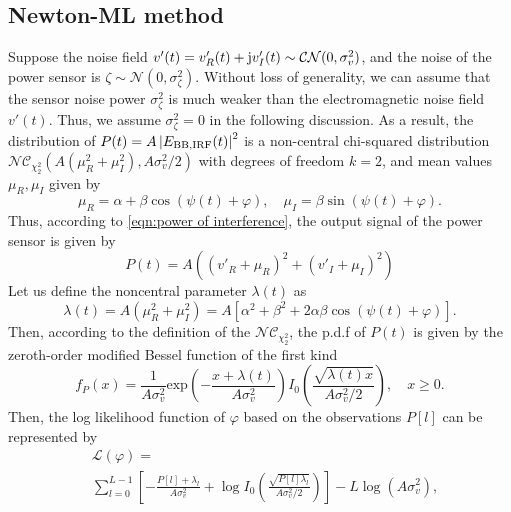 \documentclass[conference,10pt,twocolumn]{IEEEtran}
\theoremstyle{nonumberplain}
\def \exp {\text{exp}}
\def \nc {\mathcal{NC}}
\begin{document}
\subsection{Newton-ML method}  \label{ML method}
    Suppose the noise field $v'(t)=v'_R(t) + {\rm j}v'_I(t)\sim \mathcal{CN}(0, \sigma_v^2)$, and the noise of the power sensor is $\zeta \sim \mathcal{N}(0, \sigma_{\zeta}^2)$. 
    Without loss of generality, we can assume that the sensor noise power $\sigma_{\zeta}^2$ is much weaker than the electromagnetic noise field $v'(t)$.
    Thus, we assume $\sigma_{\zeta}^2=0$ in the following discussion.  
    As a result, the distribution of $P(t) = A\left|E_{{\rm BB}, {\rm IRF}}(t)\right|^2$ is a non-central chi-squared distribution $\nc_{\chi_2^2}(A(\mu_{R}^2+\mu_{I}^2),  A\sigma_v^2/2)$ with degrees of freedom $k=2$, and mean values $\mu_{R}, \mu_{I}$ given by
    \begin{equation}
        \mu_{R} = \alpha + \beta \cos(\psi(t)+\varphi),\quad  \mu_{I}  = \beta \sin(\psi(t)+\varphi).
        \label{chi2 distribution mean values}
    \end{equation}
    Thus, according to \eqref{eqn:power of interference}, the output signal of the power sensor is given by 
    \begin{equation}
        P(t)  = A\left((v'_{R} + \mu_{R})^2 + (v'_{I} + \mu_{I})^2 \right)
        \label{eqn:sensor power}
    \end{equation}
    Let us define the noncentral parameter $\lambda(t)$ as
    \begin{equation}
        \lambda(t)  = A(\mu_{R}^2 + \mu_{I}^2) = A\left[\alpha^{2}+\beta^{2}+2\alpha\beta\cos\left(\psi(t)+\varphi\right)\right].
    \end{equation}
    Then, according to the definition of the $\nc_{\chi_2^2}$, the p.d.f of $P(t)$ is given by the zeroth-order modified Bessel function of the first kind 
    \begin{equation}
        f_{P}(x) = \frac{1}{A\sigma_{v}^2} \exp\left(-\frac{x+\lambda(t)}{A\sigma_v^2}\right)I_{0}\left(\frac{\sqrt{\lambda(t) x}}{A\sigma_v^2/2}\right),\quad x \geq 0.
        \label{ML single observation}
    \end{equation}
    Then, the log likelihood function of $\varphi$ based on the observations $P[l]$ can be represented by
    \begin{equation}
        \begin{aligned}
        & \mathcal{L}(\varphi) =\\
        & \sum_{l=0}^{L-1}\left[-\frac{P[l] + \lambda_l}{A\sigma_v^2} + \log I_0\left(\frac{\sqrt{P[l] \lambda_l}}{A\sigma_v^2/2}\right)\right] - L\log(A\sigma_v^2),
        \end{aligned}
        \label{ML likelihood}
    \end{equation}
\end{document}

